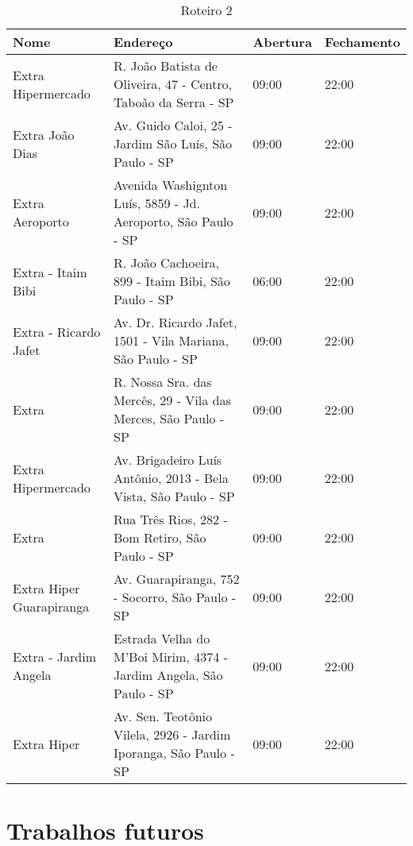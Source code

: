 \begin{table}[]
	\centering
	\caption{Roteiro 2}
	\label{Roteiro2}
	\begin{tabular}{C{3cm}C{6cm}C{3cm}C{3cm}}
		\toprule
		Nome                     & Endereço                                                           & Abertura & Fechamento \\ \midrule
		Extra Hipermercado       & R. João Batista de Oliveira, 47 - Centro, Taboão da Serra - SP     & 09:00    & 22:00      \\
		Extra João Dias          & Av. Guido Caloi, 25 - Jardim São Luís, São Paulo - SP              & 09:00    & 22:00      \\
		Extra Aeroporto          & Avenida Washignton Luís, 5859 - Jd. Aeroporto, São Paulo - SP      & 09:00    & 22:00      \\
		Extra - Itaim Bibi       & R. João Cachoeira, 899 - Itaim Bibi, São Paulo - SP                & 06:00    & 22:00      \\
		Extra - Ricardo Jafet    & Av. Dr. Ricardo Jafet, 1501 - Vila Mariana, São Paulo - SP         & 09:00    & 22:00      \\
		Extra                    & R. Nossa Sra. das Mercês, 29 - Vila das Merces, São Paulo - SP     & 09:00    & 22:00      \\
		Extra Hipermercado       & Av. Brigadeiro Luís Antônio, 2013 - Bela Vista, São Paulo - SP     & 09:00    & 22:00      \\
		Extra                    & Rua Três Rios, 282 - Bom Retiro, São Paulo - SP                    & 09:00    & 22:00      \\
		Extra Hiper Guarapiranga & Av. Guarapiranga, 752 - Socorro, São Paulo - SP                    & 09:00    & 22:00      \\
		Extra - Jardim Angela    & Estrada Velha do M'Boi Mirim, 4374 - Jardim Angela, São Paulo - SP & 09:00    & 22:00      \\
		Extra Hiper              & Av. Sen. Teotônio Vilela, 2926 - Jardim Iporanga, São Paulo - SP   & 09:00    & 22:00      \\ \bottomrule
	\end{tabular}
\end{table}


\section{Trabalhos futuros}
